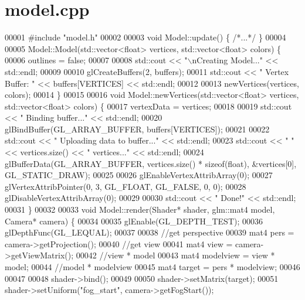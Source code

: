 \section{model.\+cpp}
\label{model_8cpp_source}

\begin{DoxyCode}
00001 \textcolor{preprocessor}{#include "model.h"}
00002 
00003 \textcolor{keywordtype}{void} Model::update() \{ \textcolor{comment}{/*...*/} \}
00004 
00005 Model::Model(std::vector<float> vertices, std::vector<float> colors) \{
00006     outlines = \textcolor{keyword}{false};
00007     
00008     std::cout << \textcolor{stringliteral}{"\(\backslash\)nCreating Model..."} << std::endl;
00009 
00010     glCreateBuffers(2, buffers);
00011     std::cout << \textcolor{stringliteral}{"  Vertex Buffer: "} << buffers[VERTICES] << std::endl;
00012 
00013     newVertices(vertices, colors);
00014 \}
00015 
00016 \textcolor{keywordtype}{void} Model::newVertices(std::vector<float> vertices, std::vector<float> colors) \{
00017     vertexData = vertices;
00018 
00019     std::cout << \textcolor{stringliteral}{"  Binding buffer..."} << std::endl;
00020     glBindBuffer(GL\_ARRAY\_BUFFER, buffers[VERTICES]);
00021 
00022     std::cout << \textcolor{stringliteral}{"  Uploading data to buffer..."} << std::endl;
00023     std::cout << \textcolor{stringliteral}{"  "} << vertices.size() << \textcolor{stringliteral}{" vertices..."} << std::endl; 
00024     glBufferData(GL\_ARRAY\_BUFFER, vertices.size() * \textcolor{keyword}{sizeof}(float), &vertices[0], GL\_STATIC\_DRAW);
00025     
00026     glEnableVertexAttribArray(0);
00027     glVertexAttribPointer(0, 3, GL\_FLOAT, GL\_FALSE, 0, 0);
00028     glDisableVertexAttribArray(0);
00029     
00030     std::cout << \textcolor{stringliteral}{"  Done!"} << std::endl;
00031 \}
00032 
00033 \textcolor{keywordtype}{void} Model::render(Shader* shader, glm::mat4 model, Camera* camera) \{
00034 
00035     glEnable(GL\_DEPTH\_TEST);
00036     glDepthFunc(GL\_LEQUAL);
00037 
00038     \textcolor{comment}{//get perspective}
00039     mat4 pers = camera->getProjection();
00040     \textcolor{comment}{//get view}
00041     mat4 view = camera->getViewMatrix();
00042     \textcolor{comment}{//view * model}
00043     mat4 modelview = view * model;
00044     \textcolor{comment}{//model * modelview}
00045     mat4 target = pers * modelview;
00046 
00047 
00048     shader->bind();
00049 
00050     shader->setMatrix(target);
00051     shader->setUniform(\textcolor{stringliteral}{"fog\_start"}, camera->getFogStart());

\end{DoxyCode}
